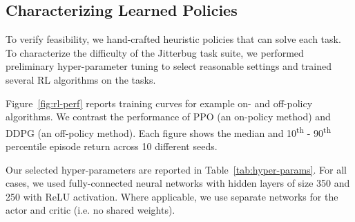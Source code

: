\documentclass[letterpaper, 10 pt, conference]{ieeeconf}
\newcommand{\rowstyle}[1]{\gdef\currentrowstyle{#1}%
    #1\ignorespaces
}
\begin{document}
\begin{table}[t]
{
    }
    
\end{table}

\subsection{Characterizing Learned Policies}

To verify feasibility, we hand-crafted heuristic policies that can solve each task.
To characterize the difficulty of the Jitterbug task suite, we performed preliminary hyper-parameter tuning to select reasonable settings and trained several RL algorithms on the tasks.

Figure~\ref{fig:rl-perf} reports training curves for example on- and off-policy algorithms.
We contrast the performance of PPO (an on-policy method) and DDPG (an off-policy method).
Each figure shows the median and 10\textsuperscript{th} - 90\textsuperscript{th} percentile episode return across 10 different seeds.

Our selected hyper-parameters are reported in Table~\ref{tab:hyper-params}.
For all cases, we used fully-connected neural networks with hidden layers of size 350 and 250 with ReLU activation.
Where applicable, we use separate networks for the actor and critic (i.e. no shared weights).
\end{document}
